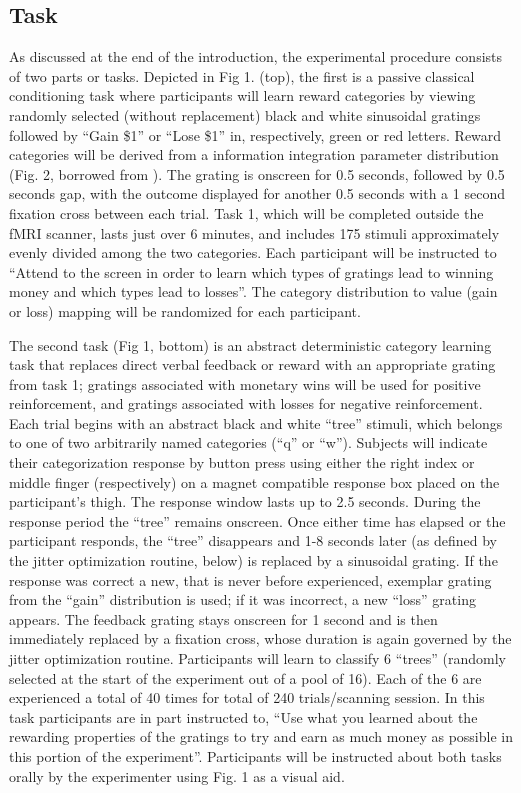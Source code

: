\documentclass[doc,12pt]{apa}        %
\begin{document}
\subsection{Task} %
\label{sub:task}
As discussed at the end of the introduction, the experimental procedure consists of two parts or tasks.  Depicted in Fig 1. (top), the first is a passive classical conditioning task where participants will learn reward categories by viewing randomly selected (without replacement) black and white sinusoidal gratings followed by ``Gain \$1'' or ``Lose \$1'' in, respectively, green or red letters.  Reward categories will be derived from a information integration parameter distribution (Fig. 2, borrowed from \cite{Spiering:2008p5008}).  The grating is onscreen for 0.5 seconds, followed by 0.5 seconds gap, with the outcome displayed for another 0.5 seconds with a 1 second fixation cross between each trial. Task 1, which will be completed outside the fMRI scanner, lasts just over 6 minutes, and includes 175 stimuli approximately evenly divided among the two categories.  Each participant will be instructed to ``Attend to the screen in order to learn which types of gratings lead to winning money and which types lead to losses''.  The category distribution to value (gain or loss) mapping will be randomized for each participant.

The second task (Fig 1, bottom) is an abstract deterministic category learning task that replaces direct verbal feedback or reward with an appropriate grating from task 1; gratings associated with monetary wins will be used for positive reinforcement, and gratings associated with losses for negative reinforcement.   Each trial begins with an abstract black and white ``tree'' stimuli, which belongs to one of two arbitrarily named categories (``q'' or ``w'').  Subjects will indicate their categorization response by button press using either the right index or middle finger (respectively) on a magnet compatible response box placed on the participant's thigh.  The response window lasts up to 2.5 seconds.  During the response period the ``tree'' remains onscreen.  Once either time has elapsed or the participant responds, the ``tree'' disappears and 1-8 seconds later (as defined by the jitter optimization routine, below) is replaced by a sinusoidal grating.  If the response was correct a new, that is never before experienced, exemplar grating from the ``gain'' distribution is used; if it was incorrect, a new ``loss'' grating appears.  The feedback grating stays onscreen for 1 second and is then immediately replaced by a fixation cross, whose duration is again governed by the jitter optimization routine.  Participants will learn to classify 6 ``trees'' (randomly selected at the start of the experiment out of a pool of 16). Each of the 6 are experienced a total of 40 times for total of 240 trials/scanning session. In this task participants are in part instructed to, ``Use what you learned about the rewarding properties of the gratings to try and earn as much money as possible in this portion of the experiment''.  Participants will be instructed about both tasks orally by the experimenter using Fig. 1 as a visual aid.
\end{document}
